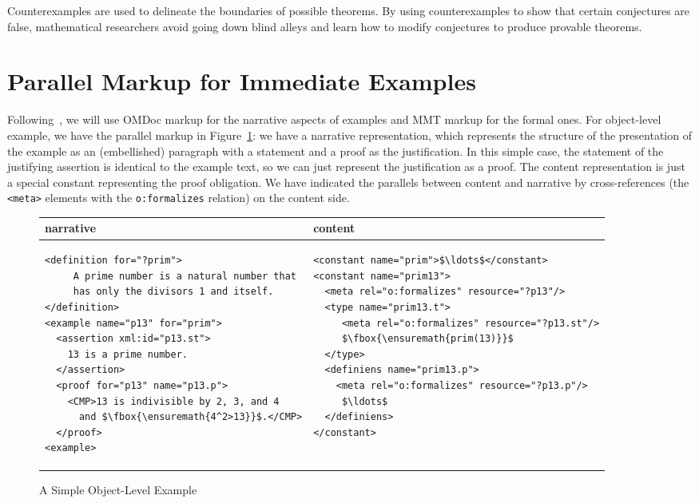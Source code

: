 \documentclass[11pt]{bluenote}
\def\mmt{MMT\xspace}
\def\omdoc{OMDoc\xspace}
\def\om#1{\fbox{\ensuremath{#1}}}
\def\omdoc{OMDoc\xspace}
\begin{document}
Counterexamples are used to delineate the boundaries of possible theorems. By using
counterexamples to show that certain conjectures are false, mathematical researchers avoid
going down blind alleys and learn how to modify conjectures to produce provable
theorems. 

\section{Parallel Markup for Immediate Examples}\label{sec:immediate}

Following~\cite{KohIan:hlpmo13}, we will use \omdoc markup for the narrative aspects of
examples and \mmt markup for the formal ones. For object-level example, we have the
parallel markup in Figure~\ref{fig:simple-object}: we have a narrative representation,
which represents the structure of the presentation of the example as an (embellished)
paragraph with a statement and a proof as the justification. In this simple case, the
statement of the justifying assertion is identical to the example text, so we can just
represent the justification as a proof. The content representation is just a special
constant representing the proof obligation. We have indicated the parallels between
content and narrative by cross-references (the \lstinline|<meta>| elements with the
\lstinline|o:formalizes| relation) on the content side.

\begin{figure}[ht]\centering
\lstset{mathescape}
\begin{tabular}{|p{7.1cm}|p{7.5cm}|}\hline
  narrative & content\\\hline
\begin{lstlisting}
<definition for="?prim">
     A prime number is a natural number that 
     has only the divisors 1 and itself.
</definition>
<example name="p13" for="prim">
  <assertion xml:id="p13.st">
    13 is a prime number.
  </assertion>
  <proof for="p13" name="p13.p">
    <CMP>13 is indivisible by 2, 3, and 4
      and $\om{4^2>13}$.</CMP>
  </proof>
<example>
\end{lstlisting}
&
\begin{lstlisting}
<constant name="prim">$\ldots$</constant>
<constant name="prim13">
  <meta rel="o:formalizes" resource="?p13"/>
  <type name="prim13.t">
     <meta rel="o:formalizes" resource="?p13.st"/>
     $\om{prim(13)}$
  </type>
  <definiens name="prim13.p">
    <meta rel="o:formalizes" resource="?p13.p"/>
     $\ldots$
  </definiens>
</constant>
\end{lstlisting}\\\hline
\end{tabular}
\caption{A Simple Object-Level Example}\label{fig:simple-object}
\end{figure}
\end{document}
